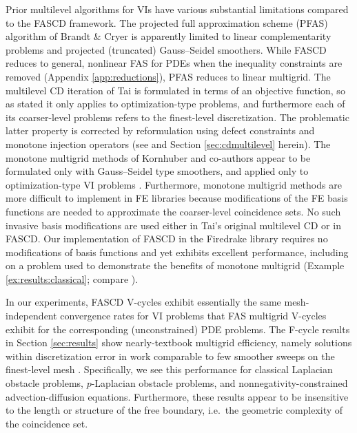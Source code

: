 \documentclass[letterpaper,final,12pt,reqno]{amsart}
\theoremstyle{cstyle}
\theoremstyle{cstyle*}
\theoremstyle{dstyle}
\numberwithin{equation}{section}
\numberwithin{figure}{section}
\numberwithin{table}{section}
\numberwithin{theorem}{section}
\begin{document}
Prior multilevel algorithms for VIs have various substantial limitations compared to the FASCD framework.  The projected full approximation scheme (PFAS) algorithm of Brandt \& Cryer \cite{BrandtCryer1983} is apparently limited to linear complementarity problems and projected (truncated) Gauss--Seidel smoothers.  While FASCD reduces to general, nonlinear FAS for PDEs when the inequality constraints are removed (Appendix \ref{app:reductions}), PFAS reduces to linear multigrid.
The multilevel CD iteration of Tai \cite{Tai2003} is formulated in terms of an objective function, so as stated it only applies to optimization-type problems, and furthermore each of its coarser-level problems refers to the finest-level discretization.  The problematic latter property is corrected by reformulation using defect constraints and monotone injection operators (see \cite[Algorithm 4.7]{GraeserKornhuber2009} and Section \ref{sec:cdmultilevel} herein).  The monotone multigrid methods of Kornhuber and co-authors \cite{GraeserKornhuber2009,Kornhuber1994} appear to be formulated only with Gauss--Seidel type smoothers, and applied only to optimization-type VI problems \cite[for example]{JouvetGraeser2013}.  Furthermore, monotone multigrid methods are more difficult to implement in FE libraries because modifications of the FE basis functions are needed to approximate the coarser-level coincidence sets.  No such invasive basis modifications are used either in Tai's original multilevel CD or in FASCD.  Our implementation of FASCD in the Firedrake library \cite{Rathgeberetal2016} requires no modifications of basis functions and yet exhibits excellent performance, including on a problem used to demonstrate the benefits of monotone multigrid (Example \ref{ex:results:classical}; compare \cite[problem 7.1.1]{GraeserKornhuber2009}).

In our experiments, FASCD V-cycles exhibit essentially the same mesh-independent convergence rates for VI problems that FAS multigrid V-cycles exhibit for the corresponding (unconstrained) PDE problems.  The F-cycle results in Section \ref{sec:results} show nearly-textbook multigrid efficiency, namely solutions within discretization error in work comparable to few smoother sweeps on the finest-level mesh \cite{BrandtLivne2011}.  Specifically, we see this performance for classical Laplacian obstacle problems, $p$-Laplacian obstacle problems, and nonnegativity-constrained advection-diffusion equations.  Furthermore, these results appear to be insensitive to the length or structure of the free boundary, i.e.~the geometric complexity of the coincidence set.
\end{document}
